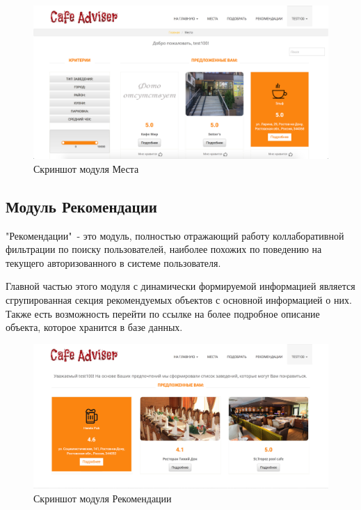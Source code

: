 \begin{figure}[H]%
	\centering
	\includegraphics[width=\textwidth]{img/places1.png}
	\caption{\label{fig:tan-aus}Скриншот модуля Места}
\end{figure}

\subsection{Модуль  Рекомендации}

"Рекомендации"\ - это модуль, полностью отражающий работу коллаборативной фильтрации по поиску пользователей, наиболее похожих по поведению на текущего авторизованного в системе пользователя.

Главной частью этого модуля с динамически формируемой информацией является сгрупированная секция рекомендуемых объектов с основной информацией о них. Также есть возможность перейти по ссылке на более подробное описание объекта, которое хранится в базе данных.

\begin{figure}%
	\centering
	\includegraphics[width=\textwidth]{img/rec1.png}
	\caption{\label{fig:tan-aus}Скриншот модуля Рекомендации}
\end{figure}


